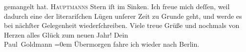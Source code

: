 \begin{ledgroupsized}[t]{13cm}
               gemangelt hat. \textsc{Hauptmanns} Stern iſt im Sinken. Ich
               freue mich deſſen, weil dadurch eine der literariſchen Lügen unſerer Zeit zu Grunde
               geht, und werde es bei nächſter Gelegenheit wiederſchreiben.\pend
           \pstart
           Viele treue Grüße und nochmals von Herzen alles Glück zum neuen Jahr! Dein {\\[\baselineskip]}\spacefill\mbox{Paul Goldmann}\pend
           \leftskip=0em{}\pstart
           \noindent{}Übermorgen fahre ich wieder nach Berlin.\pend
           
         
         \endnumbering{}\end{ledgroupsized}  \newcommand{\dateiname}{L02947}\newcommand{\titel}{Paul Goldmann an Arthur Schnitzler, 31. 12. [1900]}\newcommand{\editorInnen}{Martin Anton Müller und Laura Untner}
      